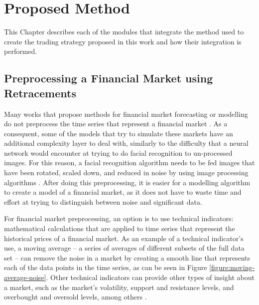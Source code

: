\chapter{Proposed Method}
\label{chapter:proposed-method}

This Chapter describes each of the modules that integrate the method used to
create the trading strategy proposed in this work and how their integration is
performed.

\section{Preprocessing a Financial Market using Retracements}
\label{section:preprocessing-a-financial-market-using-retracements}

Many works that propose methods for financial market forecasting or modelling do
not preprocess the time series that represent a financial market \cite{}. As a
consequent, some of the models that try to simulate these markets have an
additional complexity layer to deal with, similarly to the difficulty that a
neural network would encounter at trying to do facial recognition to
un-processed images. For this reason, a facial recognition algorithm needs to be
fed images that have been rotated, scaled down, and reduced in noise by using
image processing algorithms \cite{}. After doing this preprocessing, it is
easier for a modelling algorithm to create a model of a financial market, as it
does not have to waste time and effort at trying to distinguish between noise
and significant data.

For financial market preprocessing, an option is to use technical indicators:
mathematical calculations that are applied to time series that represent the
historical prices of a financial market. As an example of a technical
indicator's use, a moving average -- a series of averages of different subsets
of the full data set -- can remove the noise in a market by creating a smooth
line that represents each of the data points in the time series, as can be seen
in Figure \ref{figure:moving-average-noise}. Other technical indicators can
provide other types of insight about a market, such as the market's volatility,
support and resistance levels, and overbought and oversold levels, among others
\cite{}.

